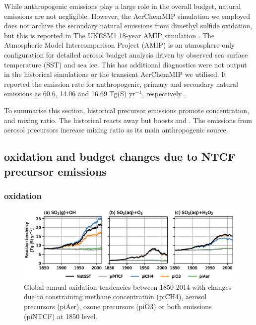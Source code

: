 While anthropogenic  emissions play a large role in the overall budget, natural emissions are not negligible. However, the AerChemMIP simulation we employed does not archive the secondary natural  emissions from dimethyl sulfide oxidation, but this is reported in The UKESM1 18-year AMIP simulation \citep{mulcahyDescriptionEvaluationAerosol2020}. The Atmospheric Model Intercomparison Project (AMIP) is an atmosphere-only configuration for detailed aerosol budget analysis driven by observed sea surface temperature (SST) and sea ice. This has additional diagnostics were not output in the historical simulations or the transient AerChemMIP we utilised. It reported the emission rate for anthropogenic, primary and secondary natural  emissions as 60.6, 14.06 and 16.69 Tg(S) yr$^{-1}$, respectively \citep{mulcahyDescriptionEvaluationAerosol2020}. 


To summarise this section, historical  precursor emissions promote  concentration,  and  mixing ratio. The historical  reacts away  but boosts  and . The  emissions from aerosol precursors increase  mixing ratio as its main anthropogenic source.

\subsection{ oxidation and budget changes due to NTCF precursor emissions}

\subsubsection{ oxidation}
\label{sec:oxidation}


\begin{figure}
    \centering
    \includegraphics[width=\linewidth]{Chapter3/Figs/f03_oxidation.eps}
    \caption{Global annual  oxidation tendencies between 1850-2014 with changes due to constraining  methane concentration (piCH4), aerosol precursors (piAer), ozone precursors (piO3) or both emissions (piNTCF) at 1850 level.}
    \label{fig:f03}
\end{figure}


